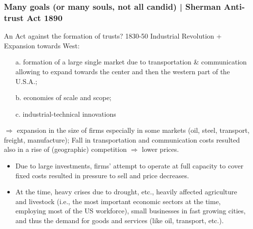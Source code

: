             \subsubsection{Many goals (or many souls, not all candid) | Sherman Anti-trust Act 1890 }   
                An Act against the formation of trusts?
                1830-50 Industrial Revolution + Expansion towards West: 
                \begin{itemize}
                    \item[a.] formation of a large single market due to transportation \& communication allowing to expand towards the center and then the western part of the U.S.A.; 
                    \item[b.] economies of scale and scope; 
                    \item[c.] industrial-technical innovations
                \end{itemize} 
                \(\Rightarrow\) expansion in the size of firms especially in some markets (oil, steel, transport, freight, manufacture); 
                Fall in transportation and communication costs resulted also in a rise of (geographic) competition \(\Rightarrow\) lower prices.

            \begin{itemize}
                \item Due to large investments, firms’ attempt to operate at full capacity to cover fixed costs resulted in pressure to sell and price decreases.
                \item At the time, heavy crises due to drought, etc., heavily affected agriculture and livestock (i.e., the most important economic sectors at the time, employing most of the US workforce), small businesses in fast growing cities, and thus the demand for goods and services (like oil, transport, etc.). 
            \end{itemize}

            

